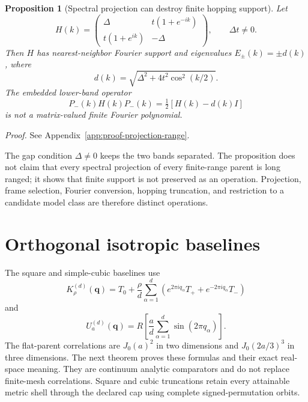 \documentclass[11pt]{article}
\newtheorem{proposition}[theorem]{Proposition}
\begin{document}
\begin{proposition}[Spectral projection can destroy finite hopping support]
\label{prop:projection-destroys-range}
Let
\begin{equation}
 H(k)=\begin{pmatrix}
 \Delta&t(1+e^{-ik})\\
 t(1+e^{ik})&-\Delta
 \end{pmatrix},
 \qquad \Delta t\ne0.
 \label{eq:projection-example}
\end{equation}
Then $H$ has nearest-neighbor Fourier support and eigenvalues
$E_\pm(k)=\pm d(k)$, where
\begin{equation}
 d(k)=\sqrt{\Delta^2+4t^2\cos^2(k/2)}.
\end{equation}
The embedded lower-band operator
\begin{equation}
 P_-(k)H(k)P_-(k)=\tfrac12[H(k)-d(k)I]
 \label{eq:projected-range}
\end{equation}
is not a matrix-valued finite Fourier polynomial.
\end{proposition}

\noindent\emph{Proof.} See Appendix~\ref{app:proof-projection-range}.


The gap condition $\Delta\ne0$ keeps the two bands separated. The proposition does not
claim that every spectral projection of every finite-range parent is long ranged; it
shows that finite support is not preserved as an operation. Projection, frame selection,
Fourier conversion, hopping truncation, and restriction to a candidate model class are
therefore distinct operations.

\section{Orthogonal isotropic baselines}

The square and simple-cubic baselines use
\begin{equation}
 K_\rho^{(d)}(\mathbf q)=T_0+\frac{\rho}{d}
 \sum_{\alpha=1}^d
 \left(e^{2\pi iq_\alpha}T_+
 +e^{-2\pi iq_\alpha}T_-\right)
 \label{eq:orthogonal-parent}
\end{equation}
and
\begin{equation}
 U_a^{(d)}(\mathbf q)=R\!\left[
 \frac{a}{d}\sum_{\alpha=1}^d\sin(2\pi q_\alpha)
 \right].
 \label{eq:rotation}
\end{equation}
The flat-parent correlations are $J_0(a)^2$ in two dimensions and
$J_0(2a/3)^3$ in three dimensions. The next theorem proves these formulas and their
exact real-space meaning. They are continuum analytic comparators and do not replace
finite-mesh correlations. Square and cubic truncations retain every attainable metric
shell through the declared cap using complete signed-permutation orbits.
\end{document}

